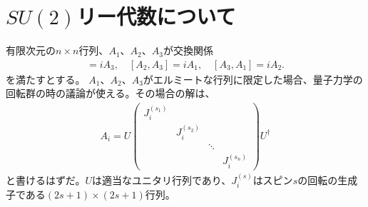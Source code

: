 \documentclass[10pt,a4paper]{jarticle}
\begin{document}
\begin{comment}
相互作用表示のハミルトニアン。
\begin{align}
H_{int.}(t) &= \int d^3x {\cal H}_{int.}, \\
{\cal H}_{int.} &= \kappa \phi \chi_1 \chi_2
\end{align}


\begin{align}
H_{int.}(t) = \int d^3x \frac{d^3 p}{(2\pi)^3} \frac{d^3 q_1}{(2\pi)^3} \frac{d^3 q_2}{(2\pi)^3} \frac{1}{\sqrt{8 E_p E_{q_1} E_{q_2}}}
a_p b_{q_1}^\dagger c_{q_2}^\dagger e^{i(\vec p - \vec q_1 - \vec q_2) \vec x} e^{-i(E_p - E_{q_1} - E_{q_2}) t}
\end{align}


\begin{align}
|i\rangle = \int \frac{d^3 p}{(2\pi)^3} f(p) a_p |0\rangle
\end{align}

\begin{align}
P = \langle i | T \exp\left( i\int_0^T dt' {\cal H}_{int.}(t') \right) \left( \frac{dq_1^3}{(2\pi)^3} \frac{dq_2^3}{(2\pi)^3} b_{q_1}^\dagger b_{q_2}^\dagger |0\rangle \langle 0 | b_{q_1} b_{q_2} \right) T \exp\left( -i\int_0^T dt' {\cal H}_{int.}(t') \right) |i\rangle 
\end{align}
\end{comment}





\appendix
\section{$SU(2)$リー代数について}
有限次元の$n\times n$行列、$A_1$、$A_2$、$A_3$が交換関係
\begin{align}
[A_1, A_2] = iA_3, \quad
[A_2, A_3] = iA_1, \quad
[A_3, A_1] = iA_2.
\end{align}
を満たすとする。
$A_1$、$A_2$、$A_3$がエルミートな行列に限定した場合、量子力学の回転群の時の議論が使える。その場合の解は、
\begin{align}
A_i = U
\left(\begin{array}{cccc}
J_i^{(s_1)} &&& \\
& J_i^{(s_2)} && \\
&& \ddots & \\
&&& J_i^{(s_n)}
\end{array}\right)
U^\dagger
\end{align}
と書けるはずだ。$U$は適当なユニタリ行列であり、$J_i^{(s)}$はスピン$s$の回転の生成子である$(2s+1)\times (2s+1)$行列。
\end{document}
